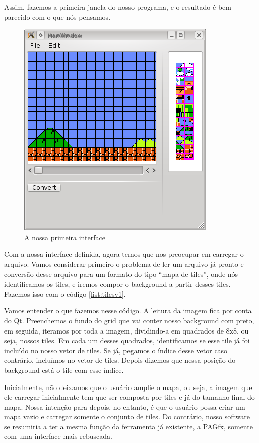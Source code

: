 \documentclass[brazil]{abnt}
\begin{document}
Assim, fazemos a primeira janela do nosso programa, e o resultado é bem parecido com o que nós pensamos.

\begin{figure}[h!]
\centering
\includegraphics{imgs/mainwindow_1.png}
\caption{A nossa primeira interface} 
\end{figure}

Com a nossa interface definida, agora temos que nos preocupar em carregar o arquivo. Vamos considerar primeiro o problema de ler um arquivo já pronto e conversão desse arquivo para um formato do tipo ``mapa de tiles'', onde nós identificamos os tiles, e iremos compor o background a partir desses tiles. Fazemos isso com o código \ref{list:tilesv1}.

Vamos entender o que fazemos nesse código. A leitura da imagem fica por conta do Qt. Preenchemos o fundo do grid que vai conter nosso background com preto, em seguida, iteramos por toda a imagem, dividindo-a em quadrados de 8x8, ou seja, nossos tiles. Em cada um desses quadrados, identificamos se esse tile já foi incluído no nosso vetor de tiles. Se já, pegamos o índice desse vetor caso contrário, incluímos no vetor de tiles. Depois dizemos que nessa posição do background está o tile com esse índice. 

Inicialmente, não deixamos que o usuário amplie o mapa, ou seja, a imagem que ele carregar inicialmente tem que ser composta por tiles e já do tamanho final do mapa. Nossa intenção para depois, no entanto, é que o usuário possa criar um mapa vazio e carregar somente o conjunto de tiles. Do contrário, nosso software se resumiria a ter a mesma função da ferramenta já existente, a PAGfx, somente com uma interface mais rebuscada.
\end{document}
